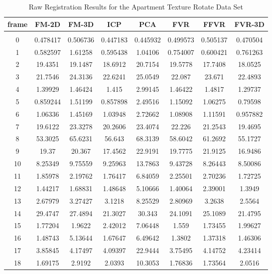 \begin{center}
\begin{longtable}{cccccccc}
\caption{Raw Registration Results for the Apartment Texture Rotate Data Set}
\label{tab:apartmenttexturerotateFULL}
\endfirsthead
\endhead
\textbf{frame} & \textbf{FM-2D} & \textbf{FM-3D} & \textbf{ICP} & \textbf{PCA} & \textbf{FVR} & \textbf{FFVR} & \textbf{FVR-3D} \\
\hline \\
0 & 0.478417 & 0.506736 & 0.447183 & 0.445932 & 0.499573 & 0.505137 & 0.470504\\
1 & 0.582597 & 1.61258 & 0.595438 & 1.04106 & 0.754007 & 0.600421 & 0.761263\\
2 & 19.4351 & 19.1487 & 18.6912 & 20.7154 & 19.5778 & 17.7408 & 18.0525\\
3 & 21.7546 & 24.3136 & 22.6241 & 25.0549 & 22.087 & 23.671 & 22.4893\\
4 & 1.39929 & 1.46424 & 1.415 & 2.99145 & 1.46422 & 1.4817 & 1.29737\\
5 & 0.859244 & 1.51199 & 0.857898 & 2.49516 & 1.15092 & 1.06275 & 0.79598\\
6 & 1.06336 & 1.45169 & 1.03948 & 2.72662 & 1.08908 & 1.11591 & 0.957882\\
7 & 19.6122 & 23.3278 & 20.2606 & 23.4074 & 22.226 & 21.2543 & 19.4695\\
8 & 53.3025 & 65.6231 & 56.643 & 68.3139 & 58.6042 & 61.2692 & 55.1727\\
9 & 19.37 & 20.367 & 17.4562 & 22.9191 & 19.7775 & 21.9125 & 16.9486\\
10 & 8.25349 & 9.75559 & 9.25963 & 13.7863 & 9.43728 & 8.26443 & 8.50086\\
11 & 1.85978 & 2.19762 & 1.76417 & 6.84059 & 2.25501 & 2.70236 & 1.72725\\
12 & 1.44217 & 1.68831 & 1.48648 & 5.10666 & 1.40064 & 2.39001 & 1.3949\\
13 & 2.67979 & 3.27427 & 3.1218 & 8.25529 & 2.80969 & 3.2638 & 2.5564\\
14 & 29.4747 & 27.4894 & 21.3027 & 30.343 & 24.1091 & 25.1089 & 21.4795\\
15 & 1.77204 & 1.9622 & 2.42012 & 7.06448 & 1.559 & 1.73455 & 1.99627\\
16 & 1.48743 & 5.13644 & 1.67647 & 6.49642 & 1.3802 & 1.37318 & 1.46306\\
17 & 3.85845 & 4.17497 & 4.09397 & 22.9444 & 3.75495 & 4.14752 & 4.23414\\
18 & 1.69175 & 2.9192 & 2.0393 & 10.3053 & 1.76836 & 1.73564 & 2.0516\\

\end{longtable}
\end{center}
